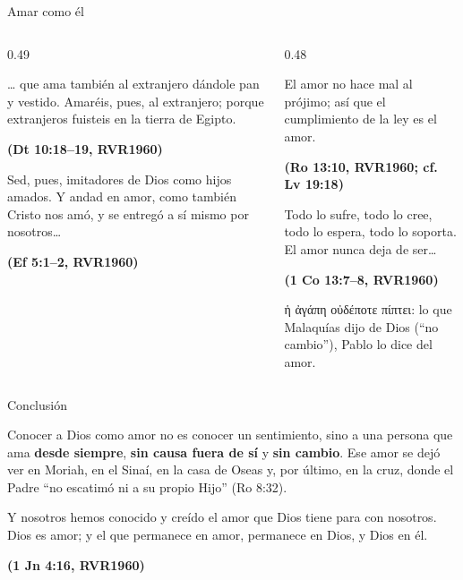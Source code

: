 \documentclass[hyperref={bookmarks=false},aspectratio=169]{beamer}
\newcommand{\grc}[1]{\foreignlanguage{ancientgreek}{#1}}
\newcommand{\fuente}[1]{\par\hfill{\upshape\bfseries\footnotesize\textcolor{azul}{#1}}}
\newcommand{\destacar}[1]{\textbf{\textcolor{azul}{#1}}}
\begin{document}
\begin{frame}{Amar como él}
\begin{columns}[t,onlytextwidth]
\begin{column}{0.49\textwidth}
\begin{cita}\ldots{} que ama también al extranjero dándole pan y vestido. Amaréis, pues, al extranjero; porque extranjeros fuisteis en la tierra de Egipto.\fuente{(Dt 10:18--19, RVR1960)}\end{cita}
\begin{cita}Sed, pues, imitadores de Dios como hijos amados. Y andad en amor, como también Cristo nos amó, y se entregó a sí mismo por nosotros\ldots\fuente{(Ef 5:1--2, RVR1960)}\end{cita}
\end{column}
\begin{column}{0.48\textwidth}
\begin{cita}El amor no hace mal al prójimo; así que el cumplimiento de la ley es el amor.\fuente{(Ro 13:10, RVR1960; cf. Lv 19:18)}\end{cita}
\begin{cita}Todo lo sufre, todo lo cree, todo lo espera, todo lo soporta. El amor nunca deja de ser\ldots\fuente{(1 Co 13:7--8, RVR1960)}\end{cita}
\scriptsize\grc{ἡ ἀγάπη οὐδέποτε πίπτει}: lo que Malaquías dijo de Dios (``no cambio''), Pablo lo dice del amor.
\end{column}
\end{columns}
\end{frame}

\begin{frame}{Conclusión}
\begin{tcolorbox}[colback=papiro,colframe=dorado,boxrule=1.2pt,arc=3pt]
\small Conocer a Dios como amor no es conocer un sentimiento, sino a una persona que ama \destacar{desde siempre}, \destacar{sin causa fuera de sí} y \destacar{sin cambio}. Ese amor se dejó ver en Moriah, en el Sinaí, en la casa de Oseas y, por último, en la cruz, donde el Padre ``no escatimó ni a su propio Hijo'' (Ro 8:32).
\end{tcolorbox}
\begin{cita}Y nosotros hemos conocido y creído el amor que Dios tiene para con nosotros. Dios es amor; y el que permanece en amor, permanece en Dios, y Dios en él.\fuente{(1 Jn 4:16, RVR1960)}\end{cita}
\end{frame}

\end{document}
